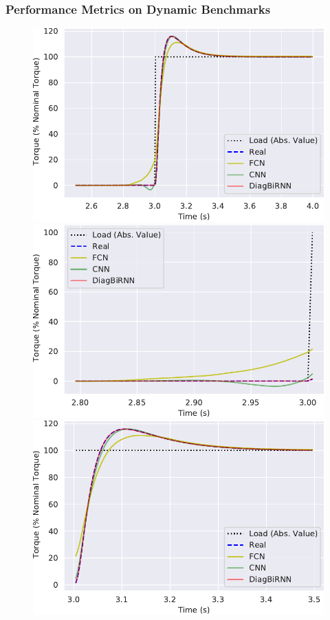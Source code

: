 \documentclass{beamer}
\begin{document}
\begin{frame}
\frametitle{Performance Metrics on Dynamic Benchmarks}

\begin{figure}
   \includegraphics[scale=0.3]{images/bench4.pdf}
    \includegraphics[scale=0.3]{images/bench4_1st.pdf} \\
    \includegraphics[scale=0.3]{images/bench4_3rd.pdf}

\end{figure}
\end{frame}
\end{document}
